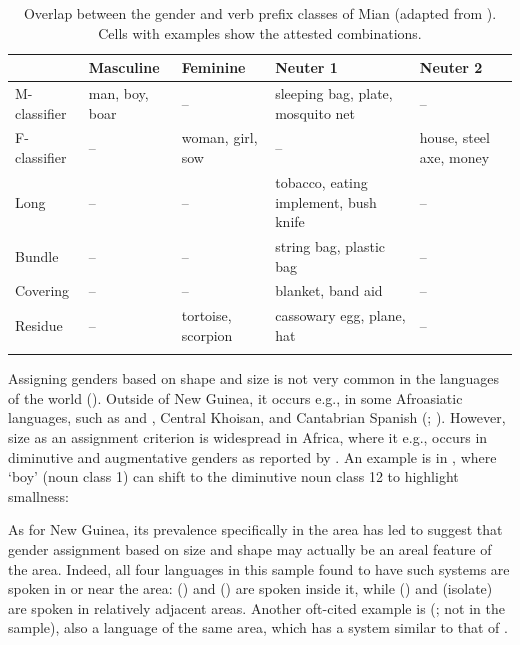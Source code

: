 \documentclass[output=collectionpaper]{langsci/langscibook}
\begin{document}
\begin{table}[htb]
\small
\begin{tabularx}{\textwidth}{lQQQQ}
\lsptoprule
  & Masculine & Feminine & Neuter 1 & Neuter 2 \\
\midrule
M-classifier & man, boy, boar & -- & sleeping bag, plate, mosquito net & -- \\
F-classifier & -- & woman, girl, sow & -- & house, steel axe, money \\
Long & -- & -- & tobacco, eating implement, bush knife & -- \\
Bundle & -- & -- & string bag, plastic bag & -- \\
Covering & -- & -- & blanket, band aid & -- \\
Residue & -- & tortoise, scorpion & cassowary egg, plane, hat & -- \\
\lspbottomrule
\end{tabularx}
\caption{Overlap between the gender and verb prefix classes of Mian (adapted from \citealt[34]{Fedden2017}). Cells with examples show the attested combinations.}
\label{tab:Svard:NEW}
\end{table}


Assigning genders based on shape and size is not very common in the languages of the world (\citealt[chap.~11]{Aikhenvald2000}). Outside of New Guinea, it occurs e.g., in some Afroasiatic languages, such as  and , Central Khoisan, and Cantabrian Spanish (\citealt[277]{Aikhenvald2000}; \citealt[191]{Heine1982}). However, size as an assignment criterion is widespread in Africa, where it e.g., occurs in diminutive and augmentative genders as reported by \citet{DiGarbo2014}. An example is in , where `boy' (noun class 1) can shift to the diminutive noun class 12 to highlight smallness:

%


As for New Guinea, its prevalence specifically in the  area has led \citet[113]{Aikhenvald2008} to suggest that gender assignment based on size and shape may actually be an areal feature of the  area. Indeed, all four languages in this sample found to have such systems are spoken in or near the  area:  () and  () are spoken inside it, while  () and  (isolate) are spoken in relatively adjacent areas. Another oft-cited example is  (\citealt{Bruce1984}; not in the sample), also a  language of the same area, which has a system similar to that of  \citep[112]{Aikhenvald2008}.
\end{document}
